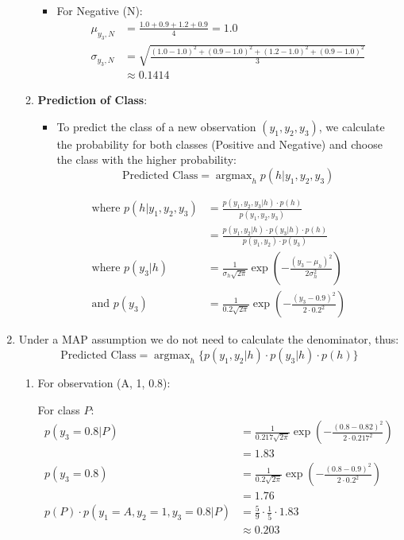 \documentclass{article}
\DeclareMathOperator*{\argmax}{argmax}
\begin{document}
\begin{enumerate}[leftmargin=\labelsep]
\begin{enumerate}
\begin{itemize}
      \item For Negative (N):
      \begin{align*}
        \mu_{y_3,N} &= \frac{1.0 + 0.9 + 1.2 + 0.9}{4} = 1.0 \\
        \sigma_{y_3,N} &= \sqrt{\frac{(1.0 - 1.0)^2 + (0.9 - 1.0)^2 + (1.2 - 1.0)^2 + (0.9 - 1.0)^2}{3}} \\
                  &\approx 0.1414
      \end{align*}

  \end{itemize}

  \item \textbf{Prediction of Class}:
  \begin{itemize}
      \item To predict the class of a new observation \((y_1, y_2, y_3)\), we calculate the probability for both classes (Positive and Negative) and choose the class with the higher probability:
      \[
      \text{Predicted Class} = \argmax_h p(h | y_1, y_2, y_3)
      \]
  \end{itemize}
  
  \begin{align*}
  \text{where } p(h | y_1, y_2, y_3) &= \frac{p(y_1, y_2, y_3 | h) \cdot p(h)}{p(y_1, y_2, y_3)} \\[10pt]
  &= \frac{p(y_1, y_2 | h) \cdot p(y_3 | h) \cdot p(h)}{p(y_1, y_2) \cdot p(y_3)} \\[10pt]
  \text{where } p(y_3 | h) &= \frac{1}{\sigma_h \sqrt{2\pi}} \exp\left(-\frac{(y_3 - \mu_h)^2}{2\sigma_h^2}\right) \\[10pt]
  \text{and } p(y_3) &= \frac{1}{0.2 \sqrt{2\pi}} \exp\left(-\frac{(y_3 - 0.9)^2}{2 \cdot 0.2^2}\right)
  \end{align*}

\end{enumerate}

\item Under a MAP assumption we do not need to calculate the
denominator, thus:
\begin{equation*}
  \text{Predicted Class} = \argmax_h \{ p(y_1, y_2 | h) \cdot p(y_3 | h) \cdot p(h) \}
\end{equation*}
\newpage
\begin{enumerate} 
  \item For observation (A, 1, 0.8):


  For class \( P \):
  \begin{align*}
  p(y_3=0.8 | P) &= \frac{1}{0.217 \sqrt{2\pi}} \exp\left(-\frac{(0.8 - 0.82)^2}{2 \cdot 0.217^2}\right) \\[10pt]
  &= 1.83\\
  p(y_3=0.8) &= \frac{1}{0.2 \sqrt{2\pi}} \exp\left(-\frac{(0.8 - 0.9)^2}{2 \cdot 0.2^2}\right) \\[10pt]
  &= 1.76\\
  p(P) \cdot p(y_1 = A, y_2 = 1, y_3=0.8 | P) &= \frac{5}{9} \cdot \frac{1}{5} \cdot 1.83 \\[10pt]
  &\approx 0.203
  \end{align*}


\end{enumerate}
\end{enumerate}
\end{document}
